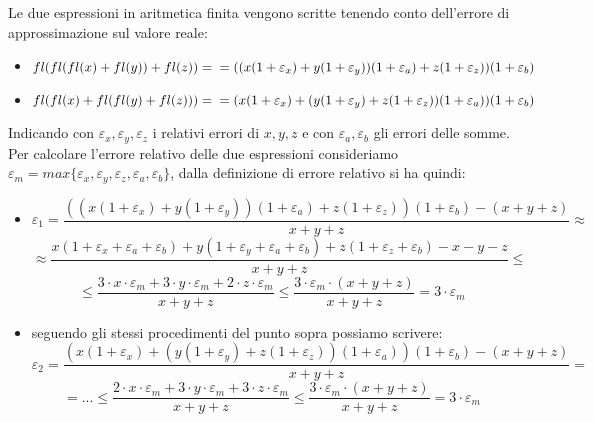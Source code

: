 Le due espressioni in aritmetica finita vengono scritte tenendo conto dell'errore di approssimazione sul valore reale:
\begin{itemize}
\item $fl(fl(fl(x)+fl(y))+fl(z)) = \\ = ((x(1+\varepsilon_{x})+y(1+\varepsilon_{y}))(1+\varepsilon_{a})+z(1+\varepsilon_{z}))(1+\varepsilon_{b})$
\item $fl(fl(x)+fl(fl(y)+fl(z))) = \\ = (x(1+\varepsilon_{x})+(y(1+\varepsilon_{y})+z(1+\varepsilon_{z}))(1+\varepsilon_{a}))(1+\varepsilon_{b})$
\end{itemize}
Indicando con $\varepsilon_{x},\varepsilon_{y},\varepsilon_{z}$ i relativi errori di $x, y, z$ e con $\varepsilon_{a},\varepsilon_{b}$ gli errori delle somme. \newline
Per calcolare l'errore relativo delle due espressioni consideriamo $\varepsilon_{m} = max\{\varepsilon_{x},\varepsilon_{y},\varepsilon_{z},\varepsilon_{a},\varepsilon_{b}\}$, dalla definizione di errore relativo si ha quindi:
\begin{itemize}
    \item 
    \[ 
    \varepsilon_{1} = \frac{((x(1+\varepsilon_{x})+y(1+\varepsilon_{y}))(1+\varepsilon_{a})+z(1+\varepsilon_{z}))(1+\varepsilon_{b})-(x+y+z)}{x+y+z} \approx
    \]
    \[
    \approx \frac{x(1+\varepsilon_{x}+\varepsilon_{a}+\varepsilon_{b})+y(1+\varepsilon_{y}+\varepsilon_{a}+\varepsilon_{b})+z(1+\varepsilon_{z}+\varepsilon_{b})-x-y-z}{x+y+z} \leq
    \]
    \[ 
    \leq \frac{3\cdot x\cdot\varepsilon_{m}+ 3\cdot y\cdot\varepsilon_{m} + 2\cdot z\cdot\varepsilon_{m}}{x+y+z} \leq \frac{3\cdot\varepsilon_{m}\cdot(x+y+z)}{x+y+z} = 3\cdot\varepsilon_{m}
    \]
    \item seguendo gli stessi procedimenti del punto sopra possiamo scrivere:
    \[
    \varepsilon_{2} = \frac{(x(1+\varepsilon_{x})+(y(1+\varepsilon_{y})+z(1+\varepsilon_{z}))(1+\varepsilon_{a}))(1+\varepsilon_{b})-(x+y+z)}{x+y+z} = 
    \]
    \[
    = ... \leq \frac{2\cdot x\cdot\varepsilon_{m}+ 3\cdot y\cdot\varepsilon_{m} + 3\cdot z\cdot\varepsilon_{m}}{x+y+z} \leq \frac{3\cdot\varepsilon_{m}\cdot(x+y+z)}{x+y+z} = 3\cdot\varepsilon_{m}
    \]
\end{itemize}
